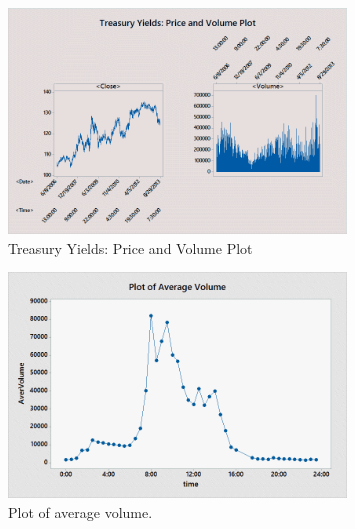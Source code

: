 \begin{figure}[!ht]
   \centering
    \includegraphics[width=0.8\textwidth]{chapters/chapter_stat_ts/figures/treasury.png}
   \caption{Treasury Yields: Price and Volume Plot \label{fig:treasuryyields}}
\end{figure}
\begin{figure}[!ht]
   \centering
    \includegraphics[width=0.8\textwidth]{chapters/chapter_stat_ts/figures/avgvol.png}
   \caption{Plot of average volume. \label{fig:averagevolume}}
\end{figure}



